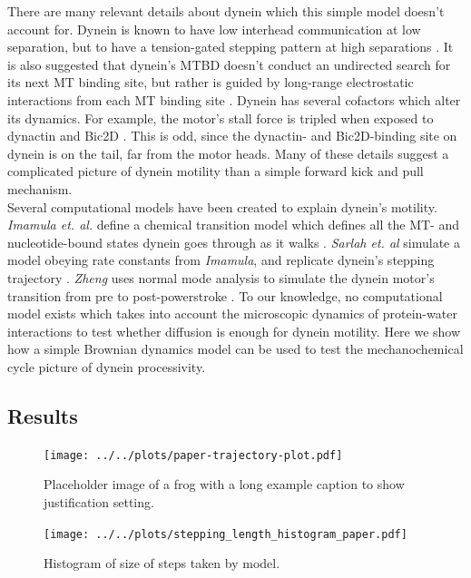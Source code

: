 \documentclass[9pt,twocolumn,twoside,lineno]{pnas-new}
\begin{document}
There are many relevant details about dynein which this simple model doesn't account for. Dynein is known to have low interhead communication at low separation, but to have a tension-gated stepping pattern at high separations \cite{yildizpaper}. It is also suggested that dynein's MTBD doesn't conduct an undirected search for its next MT binding site, but rather is guided by long-range electrostatic interactions from each MT binding site \cite{longrangemt}. Dynein has several cofactors which alter its dynamics. For example, the motor's stall force is tripled when exposed to dynactin and Bic2D \cite{yildizdynactin}. This is odd, since the dynactin- and Bic2D-binding site on dynein is on the tail, far from the motor heads. Many of these details suggest a complicated picture of dynein motility than a simple forward kick and pull mechanism.\\

Several computational models have been created to explain dynein's motility. \textit{Imamula et. al.} define a chemical transition model which defines all the MT- and nucleotide-bound states dynein goes through as it walks \cite{imamulamodel}. \textit{Sarlah et. al} simulate a model obeying rate constants from \textit{Imamula}, and replicate dynein's stepping trajectory \cite{sarlahmodel}. \textit{Zheng} uses normal mode analysis to simulate the dynein motor's transition from pre to post-powerstroke \cite{normalmodes}. To our knowledge, no computational model exists which takes into account the microscopic dynamics of protein-water interactions to test whether diffusion is enough for dynein motility. Here we show how a simple Brownian dynamics model can be used to test the mechanochemical cycle picture of dynein processivity.\\

\subsection*{Results}

\begin{figure}%
\centering
\texttt{[image: ../../plots/paper-trajectory-plot.pdf]}
\caption{Placeholder image of a frog with a long example caption to show justification setting.}
\label{fig:trajectory}
\end{figure}

\begin{figure}%
\centering
\texttt{[image: ../../plots/stepping\_length\_histogram\_paper.pdf]}
\caption{Histogram of size of steps taken by model.}
\label{fig:lengthhist}
\end{figure}
\end{document}
